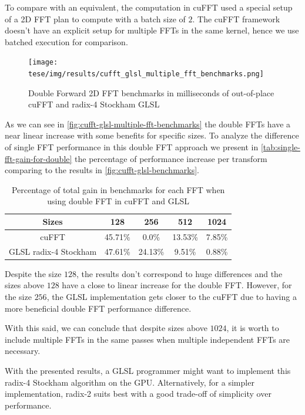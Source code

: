 \documentclass[
  oneside,
  11pt, a4paper,
  footinclude=true,
  headinclude=true,
  cleardoublepage=empty
]{scrbook}
\begin{document}
To compare with an equivalent, the computation in cuFFT used a special setup of a 2D FFT plan to compute with a batch size of $2$. The cuFFT framework doesn't have an explicit setup for multiple FFTs in the same kernel, hence we use batched execution for comparison.

\begin{figure}[h!] 
    \centering
    \texttt{[image: tese/img/results/cufft\_glsl\_multiple\_fft\_benchmarks.png]}
    \caption{Double Forward 2D FFT benchmarks in milliseconds of out-of-place cuFFT and radix-4 Stockham GLSL}
    \label{fig:cufft-glsl-multiple-fft-benchmarks}
\end{figure}

As we can see in \autoref{fig:cufft-glsl-multiple-fft-benchmarks} the double FFTs have a near linear increase with some benefits for specific sizes. To analyze the difference of single FFT performance in this double FFT approach 
we present in \autoref{tab:single-fft-gain-for-double} the percentage of performance increase per transform comparing to the results in \autoref{fig:cufft-glsl-benchmarks}.

\begin{table}[H]
    \centering
    \begin{tabular}{|c|c|c|c|c|}
    \hline
    Sizes                 & 128     & 256     & 512     & 1024   \\ \hline
    cuFFT                 & 45.71\% & 0.0\%   & 13.53\% & 7.85\% \\ \hline
    GLSL radix-4 Stockham & 47.61\% & 24.13\% & 9.51\%  & 0.88\% \\ \hline
    \end{tabular}
    \caption{Percentage of total gain in benchmarks for each FFT when using double FFT in cuFFT and GLSL}
    \label{tab:single-fft-gain-for-double}
\end{table}

Despite the size $128$, the results don't correspond to huge differences and the sizes above $128$ have a close to linear increase for the double FFT. However, for the size $256$, the GLSL implementation gets closer to the cuFFT due to having a more beneficial double FFT performance difference.

With this said, we can conclude that despite sizes above $1024$, it is worth to include multiple FFTs in the same passes when multiple independent FFTs are necessary.

With the presented results, a GLSL programmer might want to implement this radix-4 Stockham algorithm on the GPU. Alternatively, for a simpler implementation, radix-2 suits best with a good trade-off of simplicity over performance.
\end{document}
